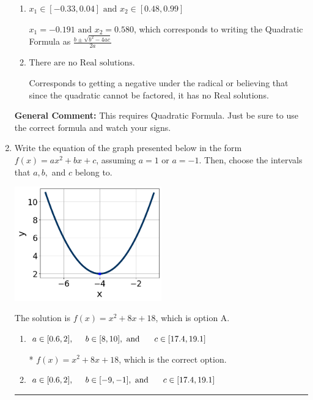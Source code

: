 \documentclass{extbook}[14pt]
\newcommand{\litem}[1]{\item #1

\rule{\textwidth}{0.4pt}}
\begin{document}
\begin{enumerate}
{\begin{enumerate}[label=\Alph*.]
 $x_1 = -14.087 \text{ and } x_2 = 13.698$, which corresponds to writing the Quadratic Formula as $-\frac{b}{2a} \pm \sqrt{b^2 - 4ac}$.
\item \( x_1 \in [-0.33, 0.04] \text{ and } x_2 \in [0.48, 0.99] \)

 $x_1 = -0.191 \text{ and } x_2 = 0.580$, which corresponds to writing the Quadratic Formula as $\frac{b \pm \sqrt{b^2 - 4ac}}{2a}$
\item \( \text{There are no Real solutions.} \)

Corresponds to getting a negative under the radical or believing that since the quadratic cannot be factored, it has no Real solutions.
\end{enumerate}

\textbf{General Comment:} This requires Quadratic Formula. Just be sure to use the correct formula and watch your signs.
}
\litem{
Write the equation of the graph presented below in the form $f(x)=ax^2+bx+c$, assuming  $a=1$ or $a=-1$. Then, choose the intervals that $a, b,$ and $c$ belong to.

\begin{center}
    \includegraphics[width=0.5\textwidth]{../Figures/quadraticGraphToEquationC.png}
\end{center}




The solution is \( f(x) = x^{2} +8 x + 18 \), which is option A.\begin{enumerate}[label=\Alph*.]
\item \( a \in [0.6, 2], \hspace*{5mm} b \in [8, 10], \text{ and } \hspace*{5mm} c \in [17.4, 19.1] \)

* $f(x)=x^{2} +8 x + 18$, which is the correct option.
\item \( a \in [0.6, 2], \hspace*{5mm} b \in [-9, -1], \text{ and } \hspace*{5mm} c \in [17.4, 19.1] \)


\end{enumerate}}
\end{enumerate}
\end{document}
